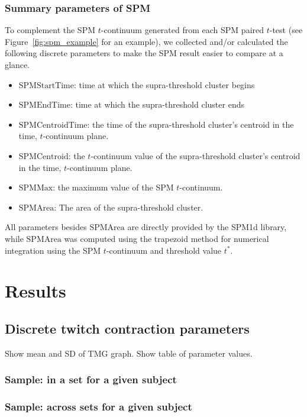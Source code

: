 \documentclass[utf8]{style/FrontiersinHarvard}
\newcommand{\SPMStart}{\ensuremath{\text{SPMStartTime}}\xspace}
\newcommand{\SPMEnd}{\ensuremath{\text{SPMEndTime}}\xspace}
\newcommand{\SPMCentroidTime}{\ensuremath{\text{SPMCentroidTime}}\xspace}
\newcommand{\SPMCentroidT}{\ensuremath{\text{SPMCentroid}}\xspace}
\newcommand{\SPMMax}{\ensuremath{\text{SPMMax}}\xspace}
\newcommand{\SPMArea}{\ensuremath{\text{SPMArea}}\xspace}
\begin{document}
\subsubsection{Summary parameters of SPM}
To complement the SPM $ t $-continuum generated from each SPM paired $ t $-test (see Figure~\ref{fig:spm_example} for an example), we collected and/or calculated the following discrete parameters to make the SPM result easier to compare at a glance.
\begin{itemize}

    \item \SPMStart: time at which the supra-threshold cluster begins
    \item \SPMEnd: time at which the supra-threshold cluster ends
    \item \SPMCentroidTime: the time of the supra-threshold cluster's centroid in the time, $ t $-continuum plane.
    \item \SPMCentroidT: the $ t $-continuum value of the supra-threshold cluster's centroid in the time, $ t $-continuum plane.
    \item \SPMMax: the maximum value of the SPM $ t $-continuum.
    \item \SPMArea: The area of the supra-threshold cluster.

\end{itemize}
All parameters besides \SPMArea are directly provided by the SPM1d library, while \SPMArea was computed using the trapezoid method for numerical integration using the SPM $ t $-continuum and threshold value $ t^{*} $.

\section{Results}
\subsection{Discrete twitch contraction parameters}

Show mean and SD of TMG graph.
Show table of parameter values.

\subsubsection{Sample: in a set for a given subject}

\subsubsection{Sample: across sets for a given subject}
\end{document}
